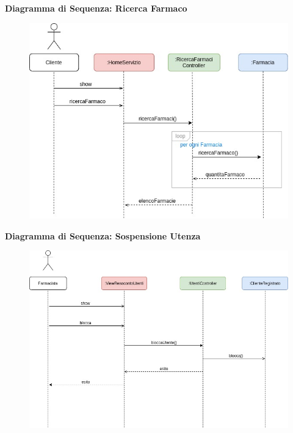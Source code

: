 \textbf{Diagramma di Sequenza: Ricerca Farmaco}

\begin{figure}[h!]
    \begin{center}
        \includegraphics[scale=0.5]{immagini/Interazione-RicercaFarmaco.jpg}
    \end{center}
\end{figure}
\hfill \break

\textbf{Diagramma di Sequenza: Sospensione Utenza}

\begin{figure}[h!]
    \begin{center}
        \includegraphics[scale=0.5]{immagini/Interazione-SospensioneUtenza.jpg}
    \end{center}
\end{figure}
\hfill \break

